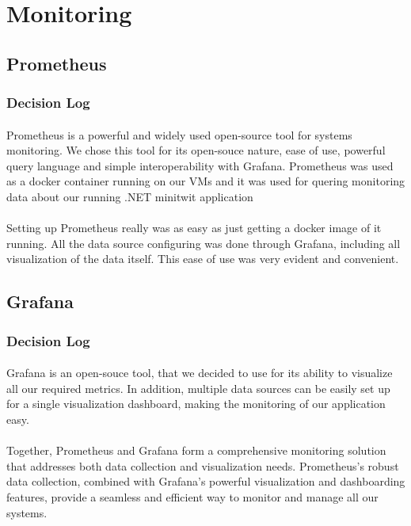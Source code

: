 \section{Monitoring}
\subsection{Prometheus}
\subsubsection{Decision Log}
\paragraph{} Prometheus is a powerful and widely used open-source tool for systems monitoring. We chose this tool for its open-souce nature, ease of use, powerful query language and simple interoperability with Grafana. Prometheus was used as a docker container running on our VMs and it was used for quering monitoring data about our running .NET minitwit application
\paragraph{} Setting up Prometheus really was as easy as just getting a docker image of it running. All the data source configuring was done through Grafana, including all visualization of the data itself. This ease of use was very evident and convenient.

\subsection{Grafana}
\subsubsection{Decision Log}
\paragraph{} Grafana is an open-souce tool, that we decided to use for its ability to visualize all our required metrics. In addition, multiple data sources can be easily set up for a single visualization dashboard, making the monitoring of our application easy.

\paragraph{} Together, Prometheus and Grafana form a comprehensive monitoring solution that addresses both data collection and visualization needs. Prometheus's robust data collection, combined with Grafana's powerful visualization and dashboarding features, provide a seamless and efficient way to monitor and manage all our systems.

